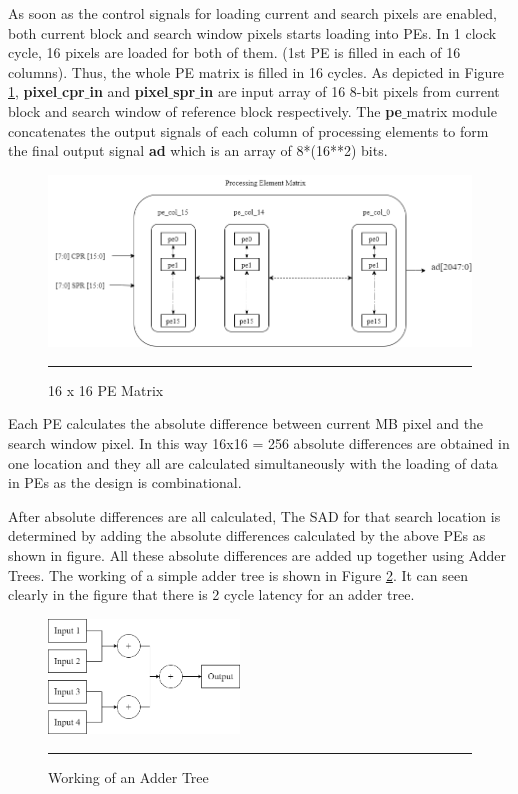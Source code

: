 As soon as the control signals for loading current and search pixels are enabled, both current block and search window pixels starts loading into PEs. In 1 clock cycle, 16 pixels are loaded for both of them. (1st PE is filled in each of 16 columns). Thus, the whole PE matrix is filled in 16 cycles. As depicted in Figure \ref{fig:pematrix}, \textbf{pixel$\_$cpr$\_$in} and \textbf{pixel$\_$spr$\_$in} are input array of 16 8-bit pixels from current block and search window of reference block respectively. The \textbf{pe$\_$}matrix module concatenates the output signals of each column of processing elements to form the final output signal \textbf{ad} which is an array of 8*(16**2) bits. 

\begin{figure}[H]
	\centering
	\includegraphics[width = 4.5in]{./Figures/pematrix.png}
	\rule{35em}{0.5pt}
	\caption{16 x 16 PE Matrix}
	\label{fig:pematrix}
\end{figure}

Each PE calculates the absolute difference between current MB pixel and the search window pixel. In this way 16x16 = 256 absolute differences are obtained in one location and they all are calculated simultaneously with the loading of data in PEs as the design is combinational. 

After absolute differences are all calculated, The SAD for that search location is determined by adding the absolute differences calculated by the above PEs as shown in figure. All these absolute differences are added up together using Adder Trees. The working of a simple adder tree is shown in Figure \ref{fig:addertree}. It can seen clearly in the figure that there is 2 cycle latency for an adder tree. 

\begin{figure}[H]
	\centering
	\includegraphics[width = 2in]{./Figures/addertree.png}
	\rule{35em}{0.5pt}
	\caption{Working of an Adder Tree}
	\label{fig:addertree}
\end{figure}

